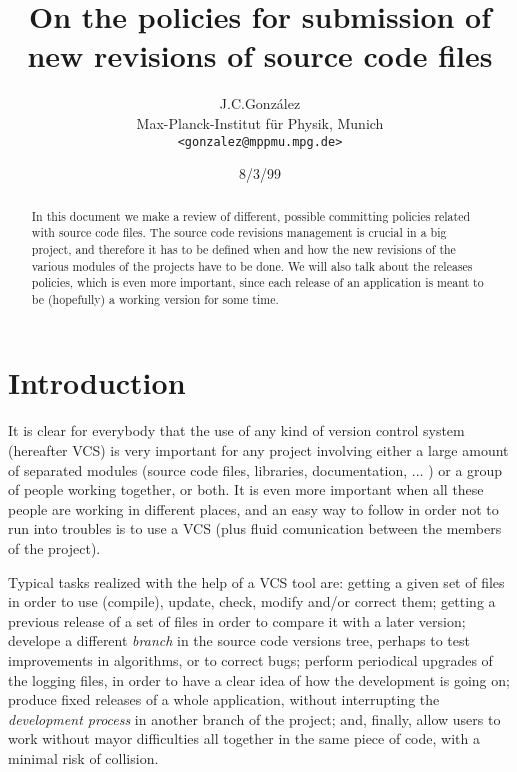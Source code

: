 \documentclass[a4paper,10pt]{article}
\begin{document}

\title{On the policies for submission of new revisions of source code
  files}

\author{J.C.Gonz\'alez\\
Max-Planck-Institut f\"ur Physik, Munich\\
{\tt <gonzalez@mppmu.mpg.de>}}

\date{8/3/99}

\maketitle

\begin{abstract}
  In this document we make a review of different, possible committing
  policies related with source code files. The source code revisions
  management is crucial in a big project, and therefore it has to be
  defined when and how the new revisions of the various modules of the
  projects have to be done. We will also talk about the releases
  policies, which is even more important, since each release of an
  application is meant to be (hopefully) a working version for some time.
\end{abstract}


\section{Introduction}

It is clear for everybody that the use of any kind of version control
system (hereafter VCS) is very important for any project involving
either a large amount of separated modules (source code files,
libraries, documentation, ... ) or a group of people working together,
or both. It is even more important when all these people are working
in different places, and an easy way to follow in order not to run
into troubles is to use a VCS (plus fluid comunication between the
members of the project).

Typical tasks realized with the help of a VCS tool are: getting a
given set of files in order to use (compile), update, check, modify
and/or correct them; getting a previous release of a set of files in
order to compare it with a later version; develope a different
\emph{branch} in the source code versions tree, perhaps to test
improvements in algorithms, or to correct bugs; perform periodical
upgrades of the logging files, in order to have a clear idea of how
the development is going on; produce fixed releases of a whole
application, without interrupting the \emph{development process} in
another branch of the project; and, finally, allow users to work
without mayor difficulties all together in the same piece of code,
with a minimal risk of collision.
\end{document}
